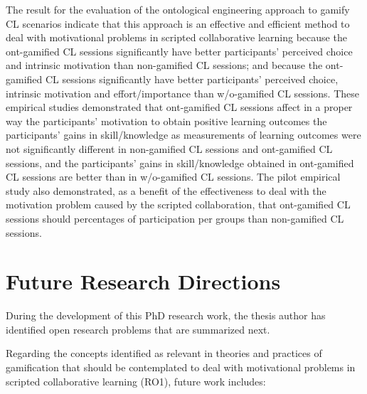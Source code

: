 The result for the evaluation of the ontological engineering approach to gamify CL scenarios indicate that this approach is an effective and efficient method to deal with motivational problems in scripted collaborative learning because
the ont-gamified CL sessions significantly have better participants' perceived choice and intrinsic motivation than non-gamified CL sessions;
and because the ont-gamified CL sessions significantly have better participants' perceived choice, intrinsic motivation and effort/importance than w/o-gamified CL sessions.
These empirical studies demonstrated that ont-gamified CL sessions affect in a proper way the participants' motivation to obtain positive learning outcomes the participants' gains in skill/knowledge as measurements of learning outcomes were not significantly different in non-gamified CL sessions and ont-gamified CL sessions, and the participants' gains in skill/knowledge obtained in ont-gamified CL sessions are better than in w/o-gamified CL sessions.
The pilot empirical study also demonstrated, as a benefit of the effectiveness to deal with the motivation problem caused by the scripted collaboration, that ont-gamified CL sessions should percentages of participation per groups than non-gamified CL sessions.

\section{Future Research Directions}
\label{sec:future-research-directions}

During the development of this PhD research work, the thesis author has identified open research problems that are summarized next.

Regarding the concepts identified as relevant in theories and practices of gamification that should be contemplated to deal with motivational problems in scripted collaborative learning (RO1), future work includes:

